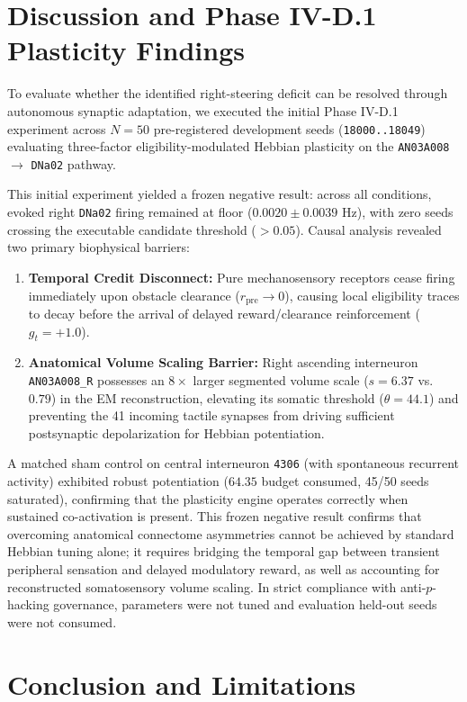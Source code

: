 \documentclass{article}
\begin{document}
\section{Discussion and Phase IV-D.1 Plasticity Findings}

To evaluate whether the identified right-steering deficit can be resolved through autonomous synaptic adaptation, we executed the initial Phase IV-D.1 experiment across $N = 50$ pre-registered development seeds (\texttt{18000..18049}) evaluating three-factor eligibility-modulated Hebbian plasticity on the \texttt{AN03A008} $\to$ \texttt{DNa02} pathway.

This initial experiment yielded a frozen negative result: across all conditions, evoked right \texttt{DNa02} firing remained at floor ($0.0020 \pm 0.0039\text{ Hz}$), with zero seeds crossing the executable candidate threshold ($>0.05$). Causal analysis revealed two primary biophysical barriers:
\begin{enumerate}
    \item \textbf{Temporal Credit Disconnect:} Pure mechanosensory receptors cease firing immediately upon obstacle clearance ($r_{\text{pre}} \to 0$), causing local eligibility traces to decay before the arrival of delayed reward/clearance reinforcement ($g_t = +1.0$).
    \item \textbf{Anatomical Volume Scaling Barrier:} Right ascending interneuron \texttt{AN03A008\_R} possesses an $8\times$ larger segmented volume scale ($s = 6.37$ vs.\ $0.79$) in the EM reconstruction, elevating its somatic threshold ($\theta = 44.1$) and preventing the 41 incoming tactile synapses from driving sufficient postsynaptic depolarization for Hebbian potentiation.
\end{enumerate}
A matched sham control on central interneuron \texttt{4306} (with spontaneous recurrent activity) exhibited robust potentiation ($64.35$ budget consumed, 45/50 seeds saturated), confirming that the plasticity engine operates correctly when sustained co-activation is present. This frozen negative result confirms that overcoming anatomical connectome asymmetries cannot be achieved by standard Hebbian tuning alone; it requires bridging the temporal gap between transient peripheral sensation and delayed modulatory reward, as well as accounting for reconstructed somatosensory volume scaling. In strict compliance with anti-$p$-hacking governance, parameters were not tuned and evaluation held-out seeds were not consumed.

\section{Conclusion and Limitations}
\end{document}
